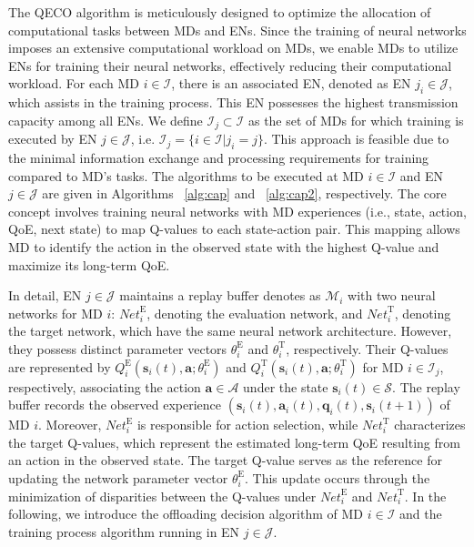 \documentclass[12pt,draftclsnofoot,onecolumn]{IEEEtran}
\begin{document}
The QECO algorithm is meticulously designed to optimize the allocation of computational tasks between MDs and ENs. Since the training of neural networks imposes an extensive computational workload on MDs, we enable MDs to utilize ENs for training their neural networks, effectively reducing their computational workload. For each MD $i \in \mathcal{I}$, there is an associated EN, denoted as EN $j_i \in \mathcal{J}$, which assists in the training process. This EN possesses the highest transmission capacity among all ENs. We define $\mathcal{I}_j \subset \mathcal{I}$ as the set of MDs for which training is executed by EN $j \in \mathcal{J}$, i.e. $\mathcal{I}_j = \{i \in \mathcal{I} | j_i = j\}$. This approach is feasible due to the minimal information exchange and processing requirements for training compared to MD's tasks. The algorithms to be executed at MD $i \in \mathcal{I}$ and EN $j \in \mathcal{J}$ are given in Algorithms ~\ref{alg:cap} and ~\ref{alg:cap2}, respectively. The core concept involves training neural networks with MD experiences (i.e., state, action, QoE, next state) to map Q-values to each state-action pair. This mapping allows MD to identify the action in the observed state with the highest Q-value and maximize its long-term QoE.




In detail, EN $j \in \mathcal{J}$ maintains a replay buffer denotes as $\mathcal{M}_i$ with two neural networks for MD $i$: $\textit{Net}_i^{\text{E}}$, denoting the evaluation network, and $\textit{Net}_i^{\text{T}}$, denoting the target network, which have the same neural network architecture. However, they possess distinct parameter vectors $\theta^{\text{E}}_i$ and $\theta^{\text{T}}_i$, respectively. Their Q-values are represented by $Q_i^{\text{E}}(\boldsymbol{s}_i(t), \boldsymbol{a}; \theta^{\text{E}}_i)$ and $Q_i^{\text{T}}(\boldsymbol{s}_i(t), \boldsymbol{a}; \theta^{\text{T}}_i)$ for MD $i \in \mathcal{I}_j$, respectively, associating the action $\boldsymbol{a} \in \mathcal{A}$ under the state $\boldsymbol{s}_i(t) \in \mathcal{S}$. The replay buffer records the observed experience $(\boldsymbol{s}_i(t), \boldsymbol{a}_i(t), \boldsymbol{q}_i(t), \boldsymbol{s}_i(t+1))$ of MD $i$. Moreover, $\textit{Net}_i^{\text{E}}$ is responsible for action selection, while $\textit{Net}_i^{\text{T}}$ characterizes the target Q-values, which represent the estimated long-term QoE resulting from an action in the observed state. The target Q-value serves as the reference for updating the network parameter vector $\theta^{\text{E}}_i$. This update occurs through the minimization of disparities between the Q-values under $\textit{Net}_i^{\text{E}}$ and $\textit{Net}_i^{\text{T}}$. In the following, we introduce the offloading decision algorithm of MD $i \in \mathcal{I}$ and the training process algorithm running in EN $j \in \mathcal{J}$.
\end{document}
